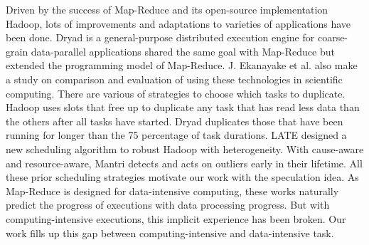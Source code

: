 Driven by the success of Map-Reduce \cite{dean} and its open-source implementation Hadoop, lots of improvements \cite{Zaharia:2008:IMP:1855741.1855744} \cite{Ananthanarayanan:2010:ROM:1924943.1924962} and adaptations \cite{Srirama:2012:ASC:2304777.2304882} to varieties of applications have been done. Dryad \cite{Isard:2007:DDD:1272998.1273005} is a general-purpose distributed execution engine for coarse-grain data-parallel applications shared the same goal with Map-Reduce but extended the programming model of Map-Reduce. J. Ekanayake et al. \cite{Ekanayake:2011:CTB:1990761.1990858} also make a study on comparison and evaluation of using these technologies in scientific computing. There are various of strategies to choose which tasks to duplicate. Hadoop uses slots that free up to duplicate any task that has read less data than the others after all tasks have started. Dryad duplicates those that have been running for longer than the 75 percentage of task durations. LATE \cite{Zaharia:2008:IMP:1855741.1855744} designed a new scheduling algorithm to robust Hadoop with heterogeneity. With cause-aware and resource-aware, Mantri \cite{Ananthanarayanan:2010:ROM:1924943.1924962} detects and acts on outliers early in their lifetime. All these prior scheduling strategies motivate our work with the speculation idea. As Map-Reduce is designed for data-intensive computing, these works naturally predict the progress of executions with data processing progress. But with computing-intensive executions, this implicit experience has been broken. Our work fills up this gap between computing-intensive and data-intensive task.


